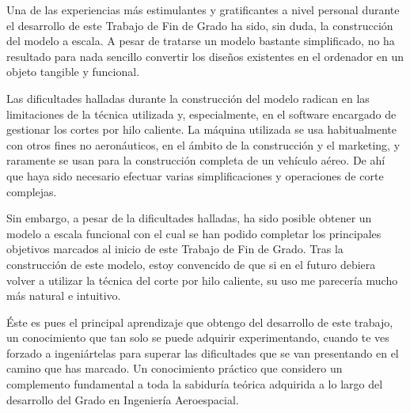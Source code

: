 Una de las experiencias más estimulantes y gratificantes a nivel personal durante el desarrollo de este Trabajo de Fin de Grado ha sido, sin duda, la construcción del modelo a escala. A pesar de tratarse un modelo bastante simplificado, no ha resultado para nada sencillo convertir los diseños existentes en el ordenador en un objeto tangible y funcional.

Las dificultades halladas durante la construcción del modelo radican en las limitaciones de la técnica utilizada y, especialmente, en el software encargado de gestionar los cortes por hilo caliente. La máquina utilizada se usa habitualmente con otros fines no aeronáuticos, en el ámbito de la construcción y el marketing, y raramente se usan para la construcción completa de un vehículo aéreo. De ahí que haya sido necesario efectuar varias simplificaciones y operaciones de corte complejas.

Sin embargo, a pesar de la dificultades halladas, ha sido posible obtener un modelo a escala funcional con el cual se han podido completar los principales objetivos marcados al inicio de este Trabajo de Fin de Grado. Tras la construcción de este modelo, estoy convencido de que si en el futuro debiera volver a utilizar la técnica del corte por hilo caliente, su uso me parecería mucho más natural e intuitivo.

Éste es pues el principal aprendizaje que obtengo del desarrollo de este trabajo, un conocimiento que tan solo se puede adquirir experimentando, cuando te ves forzado a ingeniártelas para superar las dificultades que se van presentando en el camino que has marcado. Un conocimiento práctico que considero un complemento fundamental a toda la sabiduría teórica adquirida a lo largo del desarrollo del Grado en Ingeniería Aeroespacial.

